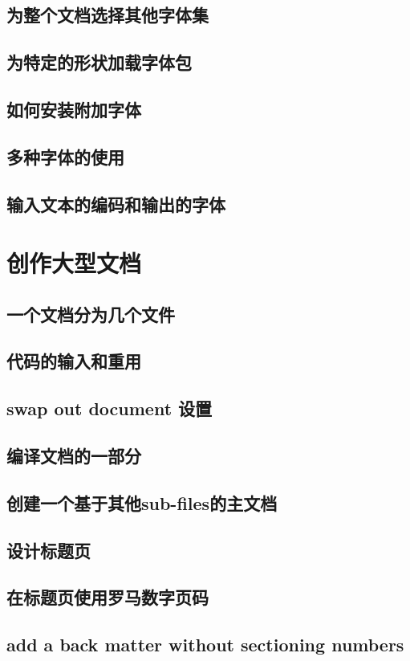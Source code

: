 \documentclass{book}
\begin{document}
	\section{为整个文档选择其他字体集}
	\section{为特定的形状加载字体包}
	\section{如何安装附加字体}
	\section{多种字体的使用}
	\section{输入文本的编码和输出的字体}
\chapter{创作大型文档}
	\section{一个文档分为几个文件}
	\section{代码的输入和重用}
	\section{swap out document 设置}
	\section{编译文档的一部分}
	\section{创建一个基于其他sub-files的主文档}
	\section{设计标题页}
	\section{在标题页使用罗马数字页码}
	\section{add a back matter without sectioning numbers}
\end{document}
